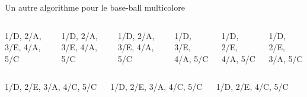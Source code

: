 \documentclass[final,hyperref={pdfpagelabels=false}]{beamer}
\renewenvironment{Coupe}{   }{   }
\begin{document}
\begin{Coupe}
\begin{frame}{Un autre algorithme pour le base-ball multicolore}
\begin{columns}
    \begin{column}{.15\linewidth}\center
                    {1/D, 2/A, 3/E, 4/A, 5/C}
    \end{column}
    \begin{column}{.15\linewidth}\center
                    {1/D, 2/A, 3/E, 4/A, 5/C}
    \end{column}
    \begin{column}{.15\linewidth}\center
                    {1/D, 2/A, 3/E, 4/A, 5/C}
    \end{column}
    \begin{column}{.15\linewidth}\center
                    {1/D,      3/E, 4/A, 5/C}
    \end{column}
    \begin{column}{.15\linewidth}\center
                    {1/D, 2/E,      4/A, 5/C}
    \end{column}    
    \begin{column}{.15\linewidth}\center
                    {1/D, 2/E, 3/A,      5/C}
    \end{column}    
  \end{columns}\vspace{-\baselineskip}
  \begin{columns}
    \begin{column}{.15\linewidth}\center
                    {1/D, 2/E, 3/A, 4/C, 5/C}
    \end{column}    
    \begin{column}{.15\linewidth}\center
                    {1/D, 2/E, 3/A, 4/C, 5/C}
    \end{column}    
    \begin{column}{.15\linewidth}\center
                    {1/D, 2/E,      4/C, 5/C}
    \end{column}    
    \begin{column}{.15\linewidth}\center

\end{column}
\end{columns}
\end{frame}
\end{Coupe}
\end{document}

